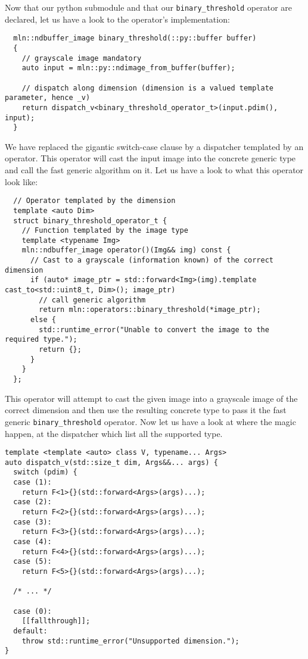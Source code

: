 Now that our python submodule and that our \texttt{binary\_threshold} operator are declared, let us have a look to the
operator's implementation:

\begin{verbatim}
  mln::ndbuffer_image binary_threshold(::py::buffer buffer)
  {
    // grayscale image mandatory
    auto input = mln::py::ndimage_from_buffer(buffer);

    // dispatch along dimension (dimension is a valued template parameter, hence _v)
    return dispatch_v<binary_threshold_operator_t>(input.pdim(), input);
  }
\end{verbatim}

We have replaced the gigantic switch-case clause by a dispatcher templated by an operator. This operator will cast the
input image into the concrete generic type and call the fast generic algorithm on it. Let us have a look to what this
operator look like:

\begin{verbatim}
  // Operator templated by the dimension
  template <auto Dim>
  struct binary_threshold_operator_t {
    // Function templated by the image type
    template <typename Img>
    mln::ndbuffer_image operator()(Img&& img) const {
      // Cast to a grayscale (information known) of the correct dimension
      if (auto* image_ptr = std::forward<Img>(img).template cast_to<std::uint8_t, Dim>(); image_ptr)
        // call generic algorithm
        return mln::operators::binary_threshold(*image_ptr);
      else {
        std::runtime_error("Unable to convert the image to the required type.");
        return {};
      }
    }
  };
\end{verbatim}

This operator will attempt to cast the given image into a grayscale image of the correct dimension and then use the
resulting concrete type to pass it the fast generic \texttt{binary\_threshold} operator. Now let us have a look at where
the magic happen, at the dispatcher which list all the supported type.

\begin{verbatim}
template <template <auto> class V, typename... Args>
auto dispatch_v(std::size_t dim, Args&&... args) {
  switch (pdim) {
  case (1):
    return F<1>{}(std::forward<Args>(args)...);
  case (2):
    return F<2>{}(std::forward<Args>(args)...);
  case (3):
    return F<3>{}(std::forward<Args>(args)...);
  case (4):
    return F<4>{}(std::forward<Args>(args)...);
  case (5):
    return F<5>{}(std::forward<Args>(args)...);

  /* ... */

  case (0):
    [[fallthrough]];
  default:
    throw std::runtime_error("Unsupported dimension.");
}
\end{verbatim}

